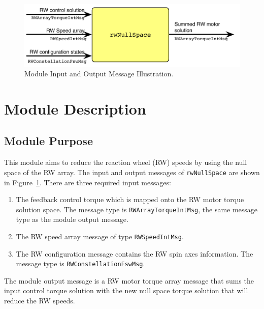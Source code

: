 

\begin{figure}[H]
	\centerline{
		\includegraphics{Figures/moduleImg}
	}
	\caption{Module Input and Output Message Illustration.}
	\label{fig:moduleImg}
\end{figure}


\section{Module Description}
\subsection{Module Purpose}
This module aims to reduce the reaction wheel (RW) speeds by using the null space of the RW array.  The input and output messages of {\tt rwNullSpace} are shown in Figure~\ref{fig:moduleImg}.  There are three required input messages:
\begin{enumerate}
	\item The feedback control torque which is mapped onto the RW motor torque solution space.  The message type is {\tt RWArrayTorqueIntMsg}, the same message type as the module output message.
	\item The RW speed array message of type {\tt RWSpeedIntMsg}.
	\item The RW configuration message contains the RW spin axes information. The message type is {\tt RWConstellationFswMsg}.
\end{enumerate}
The module output message is a RW motor torque array message that sums the input control torque solution with the new null space torque solution that will reduce the RW speeds.  


